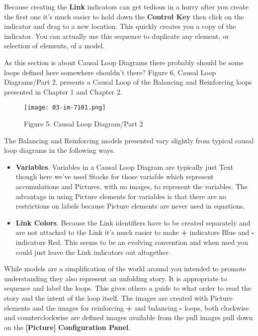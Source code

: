 \documentclass[]{memoir}
\makeatletter
\def\maxwidth{\ifdim\Gin@nat@width>\linewidth\linewidth
\else\Gin@nat@width\fi}
\let\Oldincludegraphics\includegraphics
\renewcommand{\includegraphics}[1]{\Oldincludegraphics[width=\maxwidth]{#1}}
\newcommand{\p}[1]{\textbf{{[}#1{]}}}
\renewcommand{\u}[1]{\textbf{#1}}
\makeatother
\begin{document}
Because creating the \u{Link} indicators can get tedious in a hurry
after you create the first one it's much easier to hold down the
\u{Control Key} then click on the indicator and drag to a new location.
This quickly creates you a copy of the indicator. You can actually use
this sequence to duplicate any element, or selection of elements, of a
model.

As this section is about Causal Loop Diagrams there probably should be
some loops defined here somewhere shouldn't there? Figure 6, Causal Loop
Diagrams/Part 2, presents a Causal Loop of the Balancing and Reinforcing
loops presented in Chapter 1 and Chapter 2.

\begin{figure}[htbp]
\centering
\texttt{[image: 03-im-7101.png]}
\caption{Figure 5. Causal Loop Diagram/Part 2}
\end{figure}

The Balancing and Reinforcing models presented vary slightly from
typical causal loop diagrams in the following ways.

\begin{itemize}
\itemsep1pt\parskip0pt
\item
  \textbf{Variables}. Variables in a Causal Loop Diagram are typically
  just Text though here we've used Stocks for those variable which
  represent accumulations and Pictures, with no images, to represent the
  variables. The advantage in using Picture elements for variables is
  that there are no restrictions on labels because Picture elements are
  never used in equations.
\item
  \textbf{Link Colors}. Because the Link identifiers have to be created
  separately and are not attached to the Link it's much easier to make
  \textbf{+} indicators Blue and \textbf{-} indicators Red. This seems
  to be an evolving convention and when used you could just leave the
  Link indicators out altogether.
\end{itemize}

While models are a simplification of the world around you intended to
promote understanding they also represent an unfolding story. It is
appropriate to sequence and label the loops. This gives others a guide
to what order to read the story and the intent of the loop itself. The
images are created with Picture elements and the images for reinforcing
\textbf{+} and balancing \textbf{-} loops, both clockwise and
counterclockwise are defined images available from the pull images pull
down on the \p{Picture} \u{Configuration Panel}.
\end{document}
